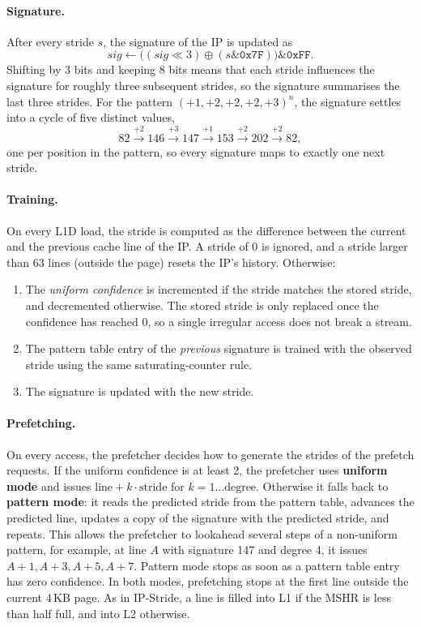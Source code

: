 \documentclass[11pt,a4paper]{article}
\begin{document}
  \paragraph{Signature.} After every stride $s$, the signature of the IP
  is updated as
  \[
    \mathit{sig} \leftarrow \big((\mathit{sig} \ll 3) \oplus
    (s \mathbin{\&} \texttt{0x7F})\big) \mathbin{\&} \texttt{0xFF}.
  \]
  Shifting by 3 bits and keeping 8 bits means that each stride influences
  the signature for roughly three subsequent strides, so the signature
  summarises the last three strides. For the pattern
  $(+1, +2, +2, +2, +3)^n$, the signature settles into a cycle of five
  distinct values,
  \[
    82 \xrightarrow{+2} 146 \xrightarrow{+3} 147 \xrightarrow{+1} 153
    \xrightarrow{+2} 202 \xrightarrow{+2} 82,
  \]
  one per position in the pattern, so every signature maps to exactly one
  next stride.

  \paragraph{Training.} On every L1D load, the stride is computed as the
  difference between the current and the previous cache line of the IP.
  A stride of 0 is ignored, and a stride larger than 63 lines (outside
  the page) resets the IP's history. Otherwise:
  \begin{enumerate}
    \item The \emph{uniform confidence} is incremented if the stride
    matches the stored stride, and decremented otherwise. The stored
    stride is only replaced once the confidence has reached 0, so a
    single irregular access does not break a stream.
    \item The pattern table entry of the \emph{previous} signature is
    trained with the observed stride using the same saturating-counter
    rule.
    \item The signature is updated with the new stride.
  \end{enumerate}

 \paragraph{Prefetching.} On every access, the prefetcher decides how to
  generate the strides of the prefetch requests.
  If the uniform confidence is at least 2, the prefetcher uses
  \textbf{uniform mode} and issues $\text{line} + k \cdot \text{stride}$
  for $k = 1 \ldots \text{degree}$. Otherwise it falls back to
  \textbf{pattern mode}: it reads the predicted stride from the pattern
  table, advances the predicted line, updates a copy of the signature with
  the predicted stride, and repeats. This allows the prefetcher to lookahead several steps
  of a non-uniform pattern, for example, at line $A$ with signature 147 and
  degree 4, it issues $A{+}1, A{+}3, A{+}5, A{+}7$. Pattern mode stops as
  soon as a pattern table entry has zero confidence. In both modes,
  prefetching stops at the first line outside the current 4\,KB page. As
  in IP-Stride, a line is filled into L1 if the MSHR is less than half
  full, and into L2 otherwise.
\end{document}
